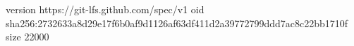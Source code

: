 version https://git-lfs.github.com/spec/v1
oid sha256:2732633a8d29e17f6b0af9d1126af63df411d2a39772799ddd7ac8c22bb1710f
size 22000
